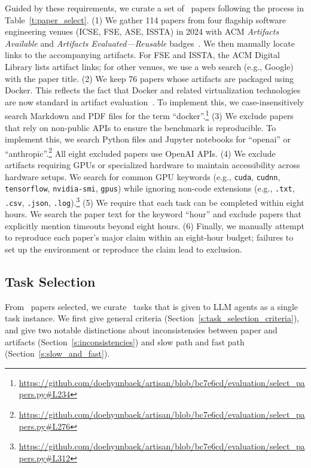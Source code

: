 Guided by these requirements, we curate a set of \papersetsize~papers following the process in Table~\ref{t:paper_select}.
(1) We gather 114 papers from four flagship software engineering venues (ICSE, FSE, ASE, ISSTA) in 2024 with ACM \emph{Artifacts Available} and \emph{Artifacts Evaluated—Reusable} badges~\cite{acm-artifact-badging-v1_1}.
We then manually locate links to the accompanying artifacts.
For FSE and ISSTA, the ACM Digital Library lists artifact links; for other venues, we use a web search (e.g., Google) with the paper title.
(2) We keep 76 papers whose artifacts are packaged using Docker.
This reflects the fact that Docker and related virtualization technologies are now standard in artifact evaluation~\cite{icse2024-ae,fse2024-ae,ase2024-ae}.
To implement this, we case-insensitively search Markdown and PDF files for the term ``docker''.\footnote{\url{https://github.com/doehyunbaek/artisan/blob/bc7e6cd/evaluation/select_papers.py\#L234}}
(3) We exclude papers that rely on non-public APIs to ensure the benchmark is reproducible.
To implement this, we search Python files and Jupyter notebooks for ``openai'' or ``anthropic''.\footnote{\url{https://github.com/doehyunbaek/artisan/blob/bc7e6cd/evaluation/select_papers.py\#L276}}
All eight excluded papers use OpenAI APIs.
(4) We exclude artifacts requiring GPUs or specialized hardware to maintain accessibility across hardware setups.
We search for common GPU keywords (e.g., \texttt{cuda}, \texttt{cudnn}, \texttt{tensorflow}, \texttt{nvidia-smi}, \texttt{gpus}) while ignoring non-code extensions (e.g., \texttt{.txt}, \texttt{.csv}, \texttt{.json}, \texttt{.log}).\footnote{\url{https://github.com/doehyunbaek/artisan/blob/bc7e6cd/evaluation/select_papers.py\#L312}}
(5) We require that each task can be completed within eight hours.
We search the paper text for the keyword ``hour'' and exclude papers that explicitly mention timeouts beyond eight hours.
(6) Finally, we manually attempt to reproduce each paper’s major claim within an eight-hour budget; failures to set up the environment or reproduce the claim lead to exclusion.

\subsection{Task Selection}
\label{s:task_select}

From \papersetsize~papers selected, we curate \tasksetsize~tasks that is given to LLM agents as a single task instance.
We first give general criteria (Section~\ref{s:task_selection_criteria}), and give two notable distinctions about inconsistensies between paper and artifacts (Section~\ref{s:inconsistencies}) and slow path and fast path (Section~\ref{s:slow_and_fast}).

